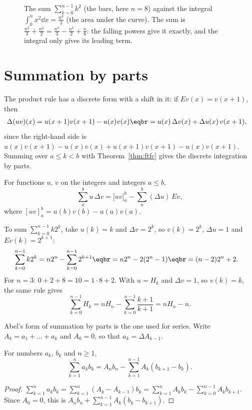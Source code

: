 \begin{figure}[ht]
\centering
{}
\caption{The sum $\sum_{k=0}^{n-1}k^2$ (the bars, here $n=8$) against the integral $\int_0^nx^2\dd x=\frac{n^3}3$ (the area
under the curve). The sum is $\frac{n^{\underline3}}3+\frac{n^{\underline2}}2=\frac{n^3}3-\frac{n^2}2+\frac n6$: the falling powers
give it exactly, and the integral only gives its leading term.}
\label{fig:staircase}
\end{figure}

\section{Summation by parts}

The product rule has a discrete form with a shift in it: if $Ev(x)=v(x+1)$, then
\[
\begin{aligned}\Delta(uv)(x)&=u(x+1)v(x+1)-u(x)v(x)\eqbr=u(x)\,\Delta v(x)+\Delta u(x)\,v(x+1),\end{aligned}
\]
since the right-hand side is $u(x)v(x+1)-u(x)v(x)+u(x+1)v(x+1)-u(x)v(x+1)$. Summing over $a\le k<b$ with
Theorem~\ref{thm:ftfc} gives the discrete integration by parts.

\begin{proposition}\label{prop:byparts}
For functions $u$, $v$ on the integers and integers $a\le b$,
\[
\sum_a^bu\,\Delta v=\bigl[uv\bigr]_a^b-\sum_a^b(\Delta u)\,Ev,
\]
where $[uv]_a^b=u(b)v(b)-u(a)v(a)$.
\end{proposition}

\begin{example}\label{ex:k2k}
To sum $\sum_{k=0}^{n-1}k2^k$, take $u(k)=k$ and $\Delta v=2^k$, so $v(k)=2^k$, $\Delta u=1$ and $Ev(k)=2^{k+1}$:
\[
\begin{aligned}\sum_{k=0}^{n-1}k2^k&=n2^n-\sum_{k=0}^{n-1}2^{k+1}\eqbr=n2^n-2(2^n-1)\eqbr=(n-2)2^n+2.\end{aligned}
\]
For $n=3$: $0+2+8=10=1\cdot8+2$. With $u=H_k$ and $\Delta v=1$, so $v(k)=k$, the same rule gives
\[
\sum_{k=0}^{n-1}H_k=nH_n-\sum_{k=0}^{n-1}\frac{k+1}{k+1}=nH_n-n.
\]
\end{example}

Abel's form of summation by parts is the one used for series. Write $A_k=a_1+\dots+a_k$ and $A_0=0$, so that
$a_k=\Delta A_{k-1}$.

\begin{proposition}\label{prop:abel}
For numbers $a_k$, $b_k$ and $n\ge1$,
\[
\sum_{k=1}^na_kb_k=A_nb_n-\sum_{k=1}^{n-1}A_k(b_{k+1}-b_k).
\]
\end{proposition}
\begin{proof}
$\sum_{k=1}^na_kb_k=\sum_{k=1}^n(A_k-A_{k-1})b_k=\sum_{k=1}^nA_kb_k-\sum_{k=0}^{n-1}A_kb_{k+1}$. Since $A_0=0$, this
is $A_nb_n+\sum_{k=1}^{n-1}A_k(b_k-b_{k+1})$.
\end{proof}

